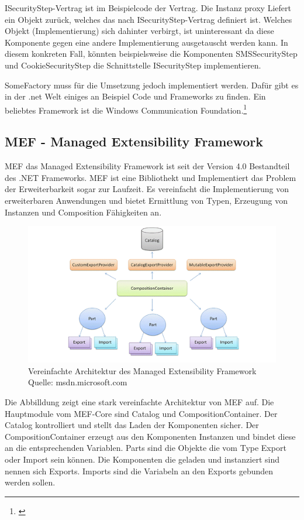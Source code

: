 ISecurityStep-Vertrag ist im Beispielcode der Vertrag. Die Instanz proxy
Liefert ein Objekt zurück, welches das nach ISecurityStep-Vertrag
definiert ist. Welches Objekt (Implementierung) sich dahinter verbirgt,
ist uninteressant da diese Komponente gegen eine andere Implementierung
ausgetauscht werden kann. In diesem konkreten Fall, könnten
beispielsweise die Komponenten SMSSecurityStep und CookieSecurityStep
die Schnittstelle ISecurityStep implementieren.

SomeFactory muss für die Umsetzung jedoch implementiert werden. Dafür
gibt es in der .net Welt einiges an Beispiel Code und Frameworks zu
finden. Ein beliebtes Framework ist die Windows Communication
Foundation.\footnote{\autocite{design-By-Contract}}

\subsection{MEF - Managed Extensibility
Framework}\label{mef---managed-extensibility-framework}

MEF das Managed Extensibility Framework ist seit der Version 4.0
Bestandteil des .NET Frameworks. MEF ist eine Bibliothekt und
Implementiert das Problem der Erweiterbarkeit sogar zur Laufzeit. Es
vereinfacht die Implementierung von erweiterbaren Anwendungen und bietet
Ermittlung von Typen, Erzeugung von Instanzen und Composition
Fähigkeiten an.

\begin{figure}[htbp]
\centering
\includegraphics{images/mef_architektur.jpg}
\caption{Vereinfachte Architektur des Managed Extensibility Framework
Quelle: msdn.microsoft.com}
\end{figure}

Die Abbilldung zeigt eine stark vereinfachte Architektur von MEF auf.
Die Hauptmodule vom MEF-Core sind Catalog und CompositionContainer. Der
Catalog kontrolliert und stellt das Laden der Komponenten sicher. Der
CompositionContainer erzeugt aus den Komponenten Instanzen und bindet
diese an die entsprechenden Variablen. Parts sind die Objekte die vom
Type Export oder Import sein können. Die Komponenten die geladen und
instanziert sind nennen sich Exports. Imports sind die Variabeln an den
Exports gebunden werden sollen.

